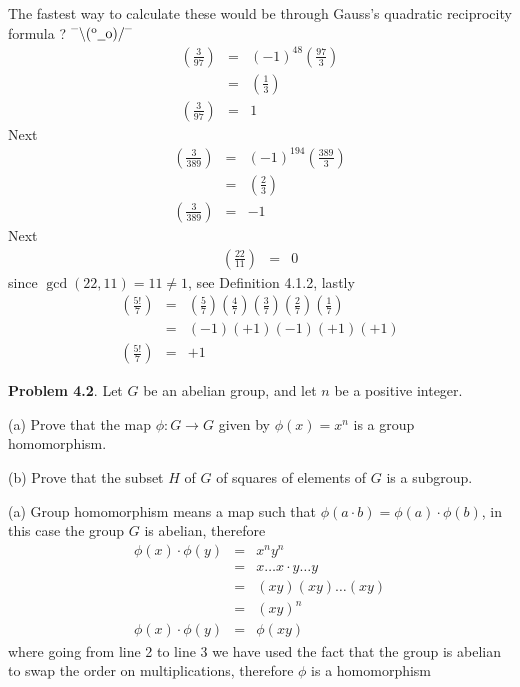 \documentclass[aps,preprint,preprintnumbers,nofootinbib,showpacs,prd]{revtex4-1}
\newcommand{\nbea}{\begin{eqnarray*}}
\newcommand{\neea}{\end{eqnarray*}}
\newcommand{\dunno}{$ {}^{\mbox {--}}\backslash(^{\rm o}{}\underline{\hspace{0.2cm}}{\rm o})/^{\mbox {--}}$}
\begin{document}
The fastest way to calculate these would be through Gauss's quadratic reciprocity formula ? \dunno
%
\nbea
\left ( \frac{3}{97} \right ) & = & (-1)^{48} \left ( \frac{97}{3}\right ) \\
& = & \left ( \frac{1}{3}\right ) \\
\left ( \frac{3}{97} \right ) & = & 1
\neea
%
Next
%
\nbea
\left ( \frac{3}{389} \right ) & = & (-1)^{194} \left ( \frac{389}{3}\right ) \\
& = & \left ( \frac{2}{3}\right ) \\
\left ( \frac{3}{389} \right ) & = & -1
\neea
%
Next
%
\nbea
\left ( \frac{22}{11} \right ) & = & 0
\neea
%
since $\gcd(22,11) = 11 \neq 1$, see Definition 4.1.2, lastly
%
\nbea
\left ( \frac{5!}{7} \right ) & = & \left ( \frac{5}{7} \right )\left ( \frac{4}{7} \right )\left ( \frac{3}{7} \right )\left ( \frac{2}{7} \right )\left ( \frac{1}{7} \right ) \\
& = & (-1)(+1)(-1)(+1)(+1) \\
\left ( \frac{5!}{7} \right ) & = & +1
\neea
%

{\bf Problem 4.2}. Let $G$ be an abelian group, and let $n$ be a positive integer. 

(a) Prove that the map $\phi : G \rightarrow G$ given by $\phi(x) = x^n$ is a group homomorphism.

(b) Prove that the subset $H$ of $G$ of squares of elements of $G$ is a subgroup.

(a) Group homomorphism means a map such that $\phi(a\cdot b) = \phi(a)\cdot\phi(b)$, in this case the group $G$ is abelian, therefore
%
\nbea
\phi(x) \cdot \phi(y) & = & x^n y^n \\
& = & x \dots x \cdot y \dots y \\
& = & (xy)(xy) \dots (xy) \\
& = & (xy)^n \\
\phi(x) \cdot \phi(y) & = & \phi(xy)
\neea
%
where going from line 2 to line 3 we have used the fact that the group is abelian to swap the order on multiplications, therefore $\phi$ is a homomorphism
\end{document}
